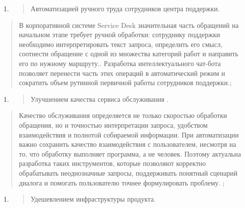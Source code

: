 \documentclass[
]{article}
\begin{document}
\begin{enumerate}
\def\labelenumi{\arabic{enumi}.}
\item
  \begin{quote}
  Автоматизацией ручного труда сотрудников центра поддержки.
  \end{quote}
\end{enumerate}

\begin{quote}
В корпоративной системе Service Desk значительная часть обращений на
начальном этапе требует ручной обработки: сотруднику поддержки
необходимо интерпретировать текст запроса, определить его смысл,
соотнести обращение с одной из множества категорий работ и направить его
по нужному маршруту.. Разработка интеллектуального чат-бота позволяет
перенести часть этих операций в автоматический режим и сократить объем
рутинной первичной работы сотрудников поддержки.;
\end{quote}

\begin{enumerate}
\def\labelenumi{\arabic{enumi}.}
\setcounter{enumi}{1}
\item
  \begin{quote}
  Улучшением качества сервиса обслуживания .
  \end{quote}
\end{enumerate}

\begin{quote}
Качество обслуживания определяется не только скоростью обработки
обращения, но и точностью интерпретации запроса, удобством
взаимодействия и полнотой собираемой информации. При автоматизации важно
сохранить качество взаимодействия с пользователем, несмотря на то, что
обработку выполняет программа, а не человек. Поэтому актуальна
разработка таких инструментов, которые позволяют корректно обрабатывать
неоднозначные запросы, поддерживать понятный сценарий диалога и помогать
пользователю точнее формулировать проблему. ;
\end{quote}

\begin{enumerate}
\def\labelenumi{\arabic{enumi}.}
\setcounter{enumi}{2}
\item
  \begin{quote}
  Удешевлением инфраструктуры продукта.
  \end{quote}
\end{enumerate}
\end{document}
